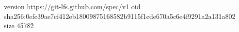 version https://git-lfs.github.com/spec/v1
oid sha256:0efc39ae7cf412eb18009875168582b9115f1cde670a5c6e4f9291a2a131a802
size 45782
